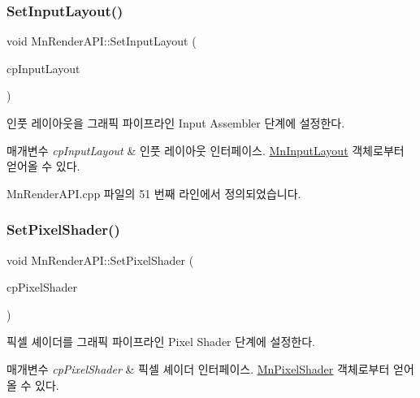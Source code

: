 \subsubsection{\texorpdfstring{Set\+Input\+Layout()}{SetInputLayout()}}
{\footnotesize\ttfamily void Mn\+Render\+A\+P\+I\+::\+Set\+Input\+Layout (\begin{DoxyParamCaption}\item[{const \hyperlink{namespace_m_n_l_aec7a2a132d6e72492d5feb5926d838dd}{C\+P\+D3\+D\+Input\+Layout} \&}]{cp\+Input\+Layout }\end{DoxyParamCaption})}



인풋 레이아웃을 그래픽 파이프라인 Input Assembler 단계에 설정한다. 


\begin{DoxyParams}{매개변수}
{\em cp\+Input\+Layout} & 인풋 레이아웃 인터페이스. \hyperlink{class_m_n_l_1_1_mn_input_layout}{Mn\+Input\+Layout} 객체로부터 얻어올 수 있다. \\
\hline
\end{DoxyParams}


Mn\+Render\+A\+P\+I.\+cpp 파일의 51 번째 라인에서 정의되었습니다.

\mbox{\label{class_m_n_l_1_1_mn_render_a_p_i_a96382bb557949573afd9a1c10eb3e11c}} 
\subsubsection{\texorpdfstring{Set\+Pixel\+Shader()}{SetPixelShader()}}
{\footnotesize\ttfamily void Mn\+Render\+A\+P\+I\+::\+Set\+Pixel\+Shader (\begin{DoxyParamCaption}\item[{const \hyperlink{namespace_m_n_l_a4d6bd408e6e19137a03728583296f12a}{C\+P\+D3\+D\+Pixel\+Shader} \&}]{cp\+Pixel\+Shader }\end{DoxyParamCaption})}



픽셀 셰이더를 그래픽 파이프라인 Pixel Shader 단계에 설정한다. 


\begin{DoxyParams}{매개변수}
{\em cp\+Pixel\+Shader} & 픽셀 셰이더 인터페이스. \hyperlink{class_m_n_l_1_1_mn_pixel_shader}{Mn\+Pixel\+Shader} 객체로부터 얻어올 수 있다. \\
\hline
\end{DoxyParams}


